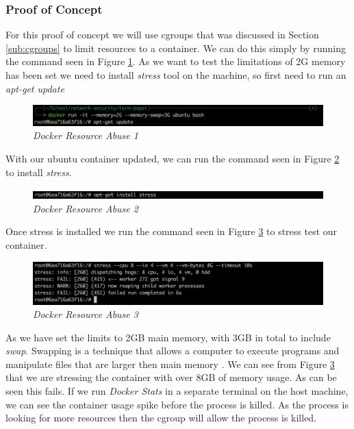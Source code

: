 \subsubsection{Proof of Concept}
For this proof of concept we will use cgroups that was discussed in Section \ref{sub:cgroups} to limit resources to a container. We can do this simply by running the command seen in Figure \ref{img:demo11}. As we want to test the limitations of 2G memory has been set we need to install \textit{stress} tool on the machine, so first need to run an \textit{apt-get update}
\begin{figure}[!ht]
\centering
\includegraphics*[width=\textwidth]{images/term11.png}
\caption{\em Docker Resource Abuse 1}
\label{img:demo11}
\end{figure}

With our ubuntu container updated, we can run the command seen in Figure \ref{img:demo12} to install \textit{stress}.
\begin{figure}[!ht]
\centering
\includegraphics*[width=\textwidth]{images/term12.png}
\caption{\em Docker Resource Abuse 2}
\label{img:demo12}
\end{figure}

Once stress is installed we run the command seen in Figure \ref{img:demo13} to stress test our container. 
\begin{figure}[!ht]
\centering
\includegraphics*[width=\textwidth]{images/term14.png}
\caption{\em Docker Resource Abuse 3}
\label{img:demo13}
\end{figure}

As we have set the limits to 2GB main memory, with 3GB in total to include \textit{swap}. Swapping is a technique that allows a computer to execute programs and manipulate files that are larger then main memory \citep{centos}. We can see from Figure \ref{img:demo13} that we are stressing the container with over 8GB of memory usage. As can be seen this fails. If we run \textit{Docker Stats} in a separate terminal on the host machine, we can see the container usage spike before the process is killed. As the process is looking for more resources then the cgroup will allow the process is killed.



